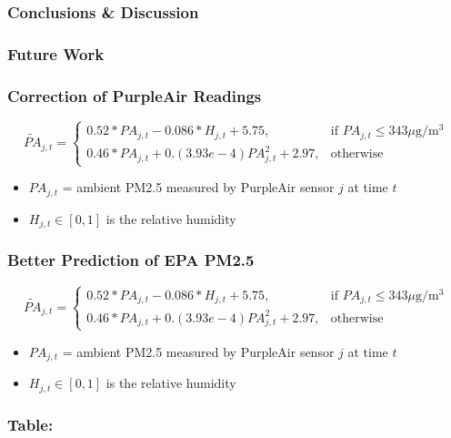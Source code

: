 \documentclass{beamer}
\begin{document}
\begin{frame}
\frametitle{Conclusions \& Discussion}
\end{frame}


\begin{frame}
\frametitle{Future Work}
\end{frame}


\begin{frame}
\frametitle{Correction of PurpleAir Readings}
$$
\widetilde{PA}_{j,t}=\begin{cases}
			0.52*PA_{j,t} - 0.086*H_{j,t} + 5.75, & \text{if $PA_{j,t} \leq 343 \mu$g/m$^3$}\\
            0.46*PA_{j,t} + 0.(3.93e-4)PA_{j,t}^2 + 2.97, & \text{otherwise}
		 \end{cases}
$$
\begin{itemize}
    \item $PA_{j,t}$ = ambient PM2.5 measured by PurpleAir sensor $j$ at time $t$
    \item $H_{j,t}\in[0,1]$ is the relative humidity
\end{itemize}
\end{frame}


\begin{frame}
\frametitle{Better Prediction of EPA PM2.5}

$$
\widetilde{PA}_{j,t}=\begin{cases}
			0.52*PA_{j,t} - 0.086*H_{j,t} + 5.75, & \text{if $PA_{j,t} \leq 343 \mu$g/m$^3$}\\
            0.46*PA_{j,t} + 0.(3.93e-4)PA_{j,t}^2 + 2.97, & \text{otherwise}
		 \end{cases}
$$
\begin{itemize}
    \item $PA_{j,t}$ = ambient PM2.5 measured by PurpleAir sensor $j$ at time $t$
    \item $H_{j,t}\in[0,1]$ is the relative humidity
\end{itemize}
\end{frame}


\begin{frame}
\frametitle{Table: }
\end{frame}
\end{document}
